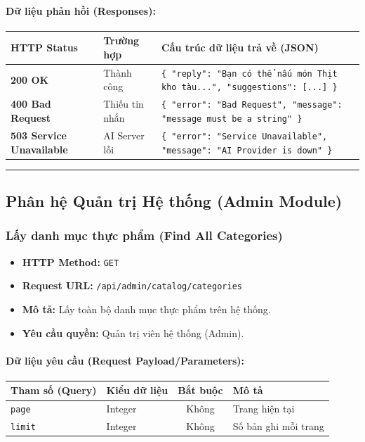 \documentclass[12pt,a4paper]{article}
\begin{document}
\paragraph{Dữ liệu phản hồi (Responses):}
\begin{longtable}{|>{\raggedright\arraybackslash}p{2.8cm}|>{\raggedright\arraybackslash}p{3.2cm}|>{\raggedright\arraybackslash}p{8.0cm}|}
\hline
\textbf{HTTP Status} & \textbf{Trường hợp} & \textbf{Cấu trúc dữ liệu trả về (JSON)} \\ \hline
\endhead
\textbf{200 OK} & Thành công & \texttt{\{ "reply": "Bạn có thể nấu món Thịt kho tàu...", "suggestions": [...] \}} \\ \hline
\textbf{400 Bad Request} & Thiếu tin nhắn & \texttt{\{ "error": "Bad Request", "message": "message must be a string" \}} \\ \hline
\textbf{503 Service Unavailable} & AI Server lỗi & \texttt{\{ "error": "Service Unavailable", "message": "AI Provider is down" \}} \\ \hline
\end{longtable}

\vskip 0.4cm
\noindent\rule{\textwidth}{0.3pt}
\vskip 0.4cm

\subsection{Phân hệ Quản trị Hệ thống (Admin Module)}

\subsubsection{Lấy danh mục thực phẩm (Find All Categories)}
\begin{itemize}[leftmargin=*]
    \item \textbf{HTTP Method:} \texttt{GET}
    \item \textbf{Request URL:} \texttt{/api/admin/catalog/categories}
    \item \textbf{Mô tả:} Lấy toàn bộ danh mục thực phẩm trên hệ thống.
    \item \textbf{Yêu cầu quyền:} Quản trị viên hệ thống (Admin).
\end{itemize}

\paragraph{Dữ liệu yêu cầu (Request Payload/Parameters):}
\begin{longtable}{|>{\raggedright\arraybackslash}p{2.8cm}|>{\raggedright\arraybackslash}p{2.2cm}|c|>{\raggedright\arraybackslash}p{7.0cm}|}
\hline
\textbf{Tham số (Query)} & \textbf{Kiểu dữ liệu} & \textbf{Bắt buộc} & \textbf{Mô tả} \\ \hline
\endhead
\texttt{page} & Integer & Không & Trang hiện tại \\ \hline
\texttt{limit} & Integer & Không & Số bản ghi mỗi trang \\ \hline
\end{longtable}
\end{document}
